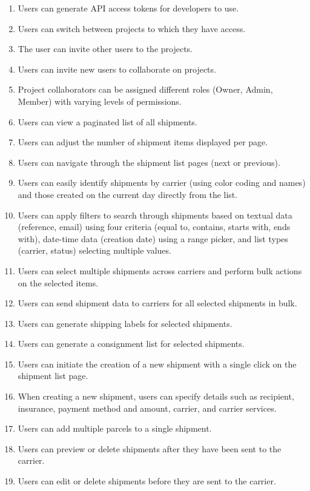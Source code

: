 \begin{enumerate}[label=\bfseries FR\arabic*:]
    \item Users can generate API access tokens for developers to use.
    \item Users can switch between projects to which they have access.
    \item The user can invite other users to the projects.
    \item Users can invite new users to collaborate on projects.
    \item Project collaborators can be assigned different roles (Owner, Admin, Member) with varying levels of permissions.
    \item Users can view a paginated list of all shipments.
    \item Users can adjust the number of shipment items displayed per page.
    \item Users can navigate through the shipment list pages (next or previous).
    \item Users can easily identify shipments by carrier (using color coding and names) and those created on the current day directly from the list.
    \item Users can apply filters to search through shipments based on textual data (reference, email) using four criteria (equal to, contains, starts with, ends with), date-time data (creation date) using a range picker, and list types (carrier, status) selecting multiple values.
    \item Users can select multiple shipments across carriers and perform bulk actions on the selected items.
    \item Users can send shipment data to carriers for all selected shipments in bulk.
    \item Users can generate shipping labels for selected shipments.
    \item Users can generate a consignment list for selected shipments.
    \item Users can initiate the creation of a new shipment with a single click on the shipment list page.
    \item When creating a new shipment, users can specify details such as recipient, insurance, payment method and amount, carrier, and carrier services.
    \item Users can add multiple parcels to a single shipment.
    \item Users can preview or delete shipments after they have been sent to the carrier.
    \item Users can edit or delete shipments before they are sent to the carrier.

\end{enumerate}
